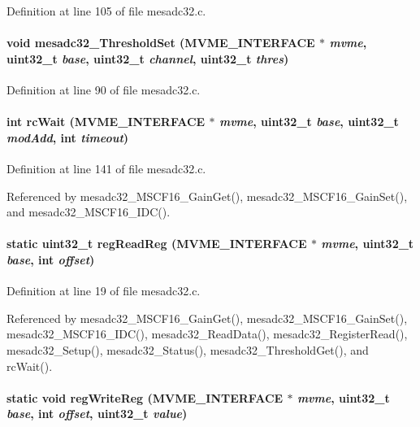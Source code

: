 Definition at line 105 of file mesadc32.c.
\paragraph[{mesadc32\_\-ThresholdSet}]{\setlength{\rightskip}{0pt plus 5cm}void mesadc32\_\-ThresholdSet ({\bf MVME\_\-INTERFACE} $\ast$ {\em mvme}, \/  uint32\_\-t {\em base}, \/  uint32\_\-t {\em channel}, \/  uint32\_\-t {\em thres})}\hfill\label{mesadc32_8c_a3c2a3c654a0b4400ebd7f41affca16f0}


Definition at line 90 of file mesadc32.c.
\paragraph[{rcWait}]{\setlength{\rightskip}{0pt plus 5cm}int rcWait ({\bf MVME\_\-INTERFACE} $\ast$ {\em mvme}, \/  uint32\_\-t {\em base}, \/  uint32\_\-t {\em modAdd}, \/  int {\em timeout})}\hfill\label{mesadc32_8c_a4df7559d58a227d88c2a6d4bdbc1d6cd}


Definition at line 141 of file mesadc32.c.

Referenced by mesadc32\_\-MSCF16\_\-GainGet(), mesadc32\_\-MSCF16\_\-GainSet(), and mesadc32\_\-MSCF16\_\-IDC().
\paragraph[{regReadReg}]{\setlength{\rightskip}{0pt plus 5cm}static uint32\_\-t regReadReg ({\bf MVME\_\-INTERFACE} $\ast$ {\em mvme}, \/  uint32\_\-t {\em base}, \/  int {\em offset})}\hfill\label{mesadc32_8c_a4723e8c6972effde5ab0b1140d79dcb0}


Definition at line 19 of file mesadc32.c.

Referenced by mesadc32\_\-MSCF16\_\-GainGet(), mesadc32\_\-MSCF16\_\-GainSet(), mesadc32\_\-MSCF16\_\-IDC(), mesadc32\_\-ReadData(), mesadc32\_\-RegisterRead(), mesadc32\_\-Setup(), mesadc32\_\-Status(), mesadc32\_\-ThresholdGet(), and rcWait().
\paragraph[{regWriteReg}]{\setlength{\rightskip}{0pt plus 5cm}static void regWriteReg ({\bf MVME\_\-INTERFACE} $\ast$ {\em mvme}, \/  uint32\_\-t {\em base}, \/  int {\em offset}, \/  uint32\_\-t {\em value})}\hfill\label{mesadc32_8c_a156988a45eb9ca2310b65af9c4470a3c}


